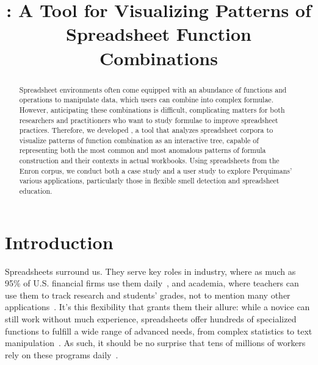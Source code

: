 \documentclass[conference]{IEEEtran}
\newcommand{\toolnameposs}{Perquimans' }
\begin{document}
 \title{\toolnameend: A Tool for Visualizing Patterns of
		Spreadsheet Function Combinations}
	
	
	\author{ 
		}
	
	
	\maketitle
	
	\begin{abstract} Spreadsheet environments often come equipped with an abundance
		of functions and operations to manipulate data, which users can combine into
		complex formulae. However, anticipating these combinations is difficult,
		complicating matters for both researchers and practitioners who want to study
		formulae to improve spreadsheet practices. Therefore, we developed
		\toolnameend, a tool that analyzes spreadsheet corpora to visualize patterns of
		function combination as an interactive tree, capable of representing both the
		most common and most anomalous patterns of formula construction and their
		contexts in actual workbooks. Using spreadsheets from the Enron corpus, we
		conduct both a case study and a user study to explore \toolnameposs various
		applications, particularly those in flexible smell detection and spreadsheet
		education.
		
	\end{abstract}
	
	\section{Introduction} Spreadsheets surround us. They serve key roles in
	industry, where as much as 95\% of U.S. financial firms use them
	daily~\cite{panko2008sarbanes}, and academia, where teachers can use them to
	track research and students' grades, not to mention many other
	applications~\cite{ko2011state}. It's this flexibility that grants them their
	allure: while a novice can still work without much experience, spreadsheets
	offer hundreds of specialized functions to fulfill a wide range of advanced
	needs, from complex statistics to text
	manipulation~\cite{nardi1990spreadsheet}. As such, it should be no surprise
	that tens of millions of workers rely on these programs
	daily~\cite{scaffidi2005estimating}.
	
\end{document}
